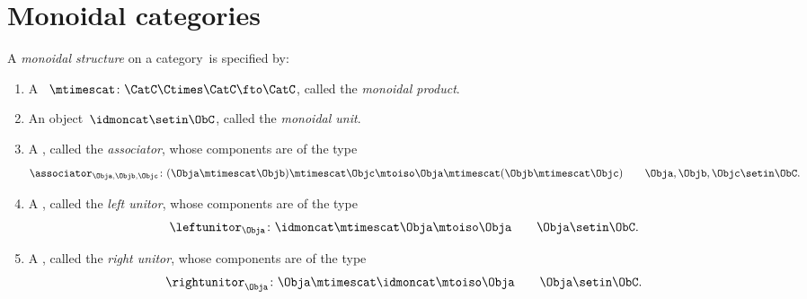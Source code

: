 
\section{Monoidal categories}
\label{sec:parallelism-mon-cat}

%

\begin{ctdefinition}
    \label{def:monoidal-cat}
    A \emph{monoidal structure} on a category~\CatC is specified by:

    \constit
    \begin{enumerate}
        \item A ~$\mtimescat \colon \CatC \Ctimes \CatC\fto \CatC$, called the \emph{monoidal product}.
        \item An object~$\idmoncat \setin \ObC$, called the \emph{monoidal unit}.
        \item A , called the \emph{associator}, whose components are of the type
              \begin{equation}
                  \associator_{\Obja,\Objb,\Objc}\colon (\Obja \mtimescat \Objb )\mtimescat \Objc \mtoiso \Obja\mtimescat (\Objb \mtimescat \Objc) \quad \quad \Obja,\Objb,\Objc\setin \ObC.
              \end{equation}
        \item A , called the \emph{left unitor}, whose components are of the type
              \begin{equation}
                  \leftunitor_\Obja \colon \idmoncat\mtimescat \Obja \mtoiso \Obja \quad \quad \Obja\setin \ObC.
              \end{equation}
        \item A , called the \emph{right unitor}, whose components are of the type
              \begin{equation}
                  \rightunitor_\Obja \colon \Obja \mtimescat \idmoncat \mtoiso \Obja \quad \quad \Obja\setin \ObC.
              \end{equation}
    \end{enumerate}


\end{ctdefinition}

